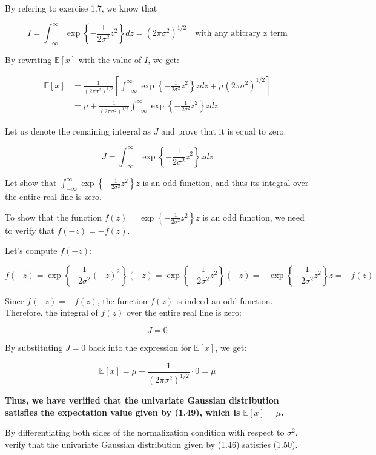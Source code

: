 \documentclass{article}
\begin{document}
\begin{tcolorbox}[breakable,colback=gray!5,colframe=gray!60,title=Solution]
By refering to exercise 1.7, we know that

\[
I = \int_{-\infty}^{\infty} \exp\left\{-\frac{1}{2\sigma^2} z^2\right\} dz = (2\pi\sigma^2)^{1/2} \quad \text{with any abitrary z term}
\]

By rewriting $\mathbb{E}[x]$ with the value of $I$, we get:

\begin{align*}
  \mathbb{E}[x] &= \frac{1}{\left(2\pi\sigma^2\right)^{1/2}} \left[ \int_{-\infty}^{\infty} \exp\left\{-\frac{1}{2\sigma^2} z^2\right\} z dz + \mu (2\pi\sigma^2)^{1/2} \right] \\
  &= \mu + \frac{1}{\left(2\pi\sigma^2\right)^{1/2}} \int_{-\infty}^{\infty} \exp\left\{-\frac{1}{2\sigma^2} z^2\right\} z dz
\end{align*}

Let us denote the remaining integral as \( J \) and prove that it is equal to zero:

\[
J = \int_{-\infty}^{\infty} \exp\left\{-\frac{1}{2\sigma^2} z^2\right\} z dz
\]

Let show that $\int_{-\infty}^{\infty} \exp\left\{-\frac{1}{2\sigma^2} z^2\right\} z$ is an odd function, and thus its integral over the entire real line is zero.

To show that the function \( f(z) = \exp\left\{-\frac{1}{2\sigma^2} z^2\right\} z \) is an odd function, we need to verify that \( f(-z) = -f(z) \).

Let's compute \( f(-z) \):

\[
f(-z) = \exp\left\{-\frac{1}{2\sigma^2} (-z)^2\right\} (-z) = \exp\left\{-\frac{1}{2\sigma^2} z^2\right\} (-z) = -\exp\left\{-\frac{1}{2\sigma^2} z^2\right\} z = -f(z)
\]

Since \( f(-z) = -f(z) \), the function \( f(z) \) is indeed an odd function. Therefore, the integral of \( f(z) \) over the entire real line is zero:

\[
J = 0
\]

By substituting \( J = 0 \) back into the expression for \( \mathbb{E}[x] \), we get:

\[
\mathbb{E}[x] = \mu + \frac{1}{\left(2\pi\sigma^2\right)^{1/2}} \cdot 0 = \mu
\]

\textbf{Thus, we have verified that the univariate Gaussian distribution satisfies the expectation value given by (1.49), which is \( \mathbb{E}[x] = \mu \).}

\vspace{1em}

By differentiating both sides of the normalization condition with respect to $\sigma^2$, verify that the univariate Gaussian distribution given by (1.46) satisfies (1.50).


\end{tcolorbox}
\end{document}
